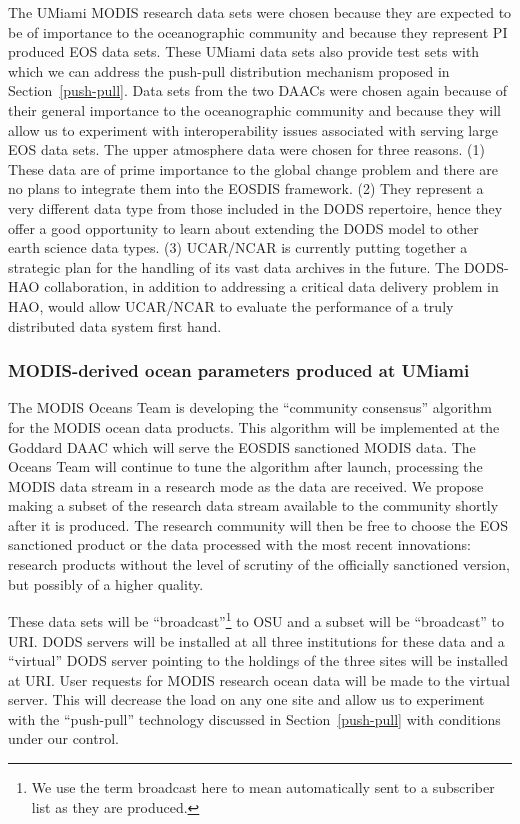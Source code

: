 \documentclass[12pt]{article}
\begin{document}
The \ac{UMiami} \acs{MODIS} research data sets were chosen because they
are expected to be of importance to the oceanographic community and because 
they represent \ac{PI} produced \acs{EOS} data sets. These \ac{UMiami}
data sets also provide test sets with which we can address the push-pull
distribution mechanism proposed in Section~\ref{push-pull}. Data sets from 
the two \ac{DAAC}s were chosen again because of their general 
importance to the oceanographic community and because they will allow 
us to experiment with interoperability issues associated with serving 
large \acs{EOS} data sets. The upper atmosphere 
data were chosen for three reasons. (1) These data are of prime 
importance to the global change problem and there are no plans to 
integrate them into the \acs{EOSDIS} framework. (2) They represent 
a very different data type from those included in the \ac{DODS} 
repertoire, hence they offer a good opportunity to learn 
about extending the \ac{DODS} model to other earth science data
types. (3) \ac{UCAR}/\ac{NCAR} is currently putting together a 
strategic plan for the handling of its vast data archives in the 
future. The \ac{DODS}-\ac{HAO} collaboration, in addition to addressing 
a critical data delivery problem in \ac{HAO}, would allow 
\ac{UCAR}/\ac{NCAR} to evaluate the performance of a truly 
distributed data system first hand. 

\subsubsection{\acs{MODIS}-derived ocean parameters produced at 
\ac{UMiami}}\label{modis-data}

The \acs{MODIS} Oceans Team is developing the ``community consensus''
algorithm for the \acs{MODIS} ocean data products. This algorithm
will be implemented at the Goddard \ac{DAAC} which will serve the
\acs{EOSDIS} sanctioned \acs{MODIS} data. The Oceans Team will 
continue to tune the algorithm after launch, processing
the \acs{MODIS} data stream in a research mode as the data are received.
We propose making a subset of the research data stream available to 
the community shortly after it is produced. The research community 
will then be free to choose the \acs{EOS} sanctioned product or the 
data processed with the most recent innovations: research products 
without the level of scrutiny of the officially sanctioned 
version, but possibly of a higher quality.

These data sets will be ``broadcast''\footnote{We use the term 
broadcast here to mean automatically sent to a subscriber list as 
they are produced.} to \ac{OSU} and a subset will be ``broadcast'' 
to \ac{URI}. \ac{DODS} servers will be installed at all three 
institutions for these data and a ``virtual'' \ac{DODS} server 
pointing to the holdings of the three sites will be installed at 
\ac{URI}. User requests for \acs{MODIS} research ocean data will 
be made to the virtual server. This will decrease the load on any 
one site and allow us to experiment with the ``push-pull'' technology 
discussed in Section~\ref{push-pull} with conditions under our
control.
\end{document}
